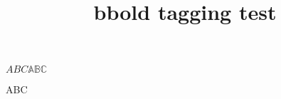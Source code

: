 \documentclass{article}
\title{bbold tagging test}
\begin{document}
$ABC\mathbb{ABC}$

ABC
\end{document}
